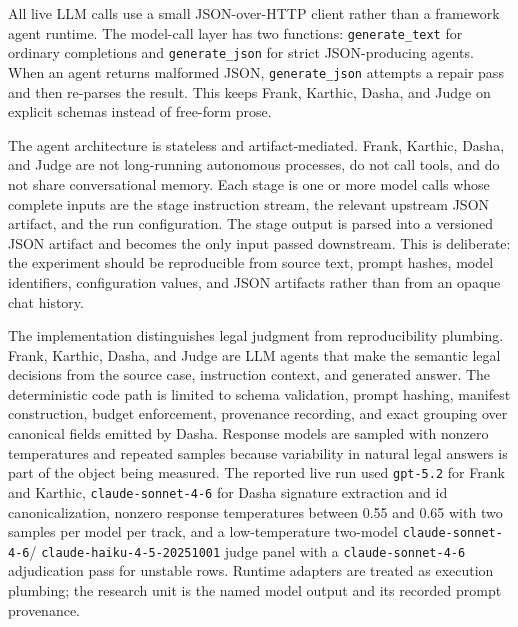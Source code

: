 All live LLM calls use a small JSON-over-HTTP client rather than a framework
agent runtime. The model-call layer has two functions: \texttt{generate\_text}
for ordinary completions and \texttt{generate\_json} for strict JSON-producing
agents. When an agent returns malformed JSON, \texttt{generate\_json} attempts a
repair pass and then re-parses the result. This keeps Frank, Karthic, Dasha, and
Judge on explicit schemas instead of free-form prose.

The agent architecture is stateless and artifact-mediated. Frank, Karthic,
Dasha, and Judge are not long-running autonomous processes, do not call tools,
and do not share conversational memory. Each stage is one or more model calls
whose complete inputs are the stage instruction stream, the relevant upstream
JSON artifact, and the run configuration. The stage output is parsed into a
versioned JSON artifact and becomes the only input passed downstream. This is
deliberate: the experiment should be reproducible from source text, prompt
hashes, model identifiers, configuration values, and JSON artifacts rather than
from an opaque chat history.

The implementation distinguishes legal judgment from reproducibility plumbing.
Frank, Karthic, Dasha, and Judge are LLM agents that make the semantic legal
decisions from the source case, instruction context, and generated answer. The
deterministic code path is limited to schema validation, prompt hashing,
manifest construction, budget enforcement, provenance recording, and exact
grouping over canonical fields emitted by Dasha. Response models are sampled
with nonzero temperatures and repeated samples because variability in natural
legal answers is part of the object being measured. The reported live run used
\texttt{gpt-5.2} for Frank and Karthic, \texttt{claude-sonnet-4-6} for Dasha
signature extraction and id canonicalization, nonzero response temperatures
between 0.55 and 0.65 with two samples per model per track, and a
low-temperature two-model \texttt{claude-sonnet-4-6}/
\texttt{claude-haiku-4-5-20251001} judge panel with a
\texttt{claude-sonnet-4-6} adjudication pass for unstable rows. Runtime
adapters are treated as execution plumbing; the research unit is the named
model output and its recorded prompt provenance.

